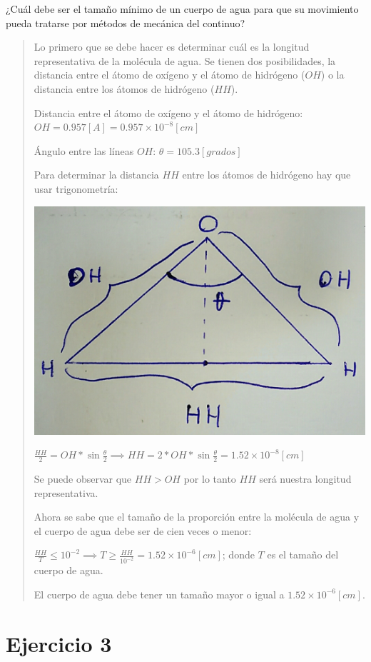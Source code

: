 \documentclass[a4paper,12pt,twoside,final,spanish]{article}
\begin{document}
¿Cuál debe ser el tamaño mínimo de un cuerpo de agua para que su movimiento pueda tratarse por métodos de mecánica del continuo? 

\dotfill

\begin{quote}
Lo primero que se debe hacer es determinar cuál es la longitud representativa de la molécula de agua. Se tienen dos posibilidades, la distancia entre el átomo de oxígeno y el átomo de hidrógeno ($OH$) o la distancia entre los átomos de hidrógeno ($HH$).

Distancia entre el átomo de oxígeno y el átomo de hidrógeno: $OH = 0.957 [A]=0.957\times 10^{-8}[cm]$

Ángulo entre las líneas $OH$: $\theta=105.3[grados]$

Para determinar la distancia $HH$ entre los átomos de hidrógeno hay que usar trigonometría:

\begin{center}
\includegraphics[width=0.5\linewidth,keepaspectratio]{ejercicio2}
\end{center}

$\frac{HH}{2}=OH*\sin{\frac{\theta}{2}} \implies HH=2*OH*\sin{\frac{\theta}{2}}=1.52\times10^{-8}[cm]$

Se puede observar que $HH>OH$ por lo tanto $HH$ será nuestra longitud representativa.

Ahora se sabe que el tamaño de la proporción entre la molécula de agua y el cuerpo de agua debe ser de cien veces o menor:

$\frac{HH}{T}\leq10^{-2} \implies T\geq\frac{HH}{10^{-2}}=1.52\times10^{-6}[cm]$; donde $T$ es el tamaño del cuerpo de agua.

El cuerpo de agua debe tener un tamaño mayor o igual a $1.52\times10^{-6}[cm]$.

\end{quote}

\section{Ejercicio 3}
\end{document}
